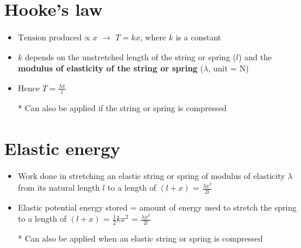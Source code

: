 \section{Hooke's law}
\begin{itemize}
    \item $\text{Tension produced}\propto x$ $\rightarrow$ $T=kx$, where $k$ is a constant
    \item $k$ depends on the unstretched length of the string or spring ($l$) and the \textbf{modulus of elasticity of the string or spring} ($\lambda$, unit = N)
    \item Hence $T=\frac{\lambda x}{l}$
    \item[*] Can also be applied if the string or spring is compressed
\end{itemize}

\section{Elastic energy}
\begin{itemize}
    \item Work done in stretching an elastic string or spring of modulus of elasticity $\lambda$ from its natural length $l$ to a length of $(l+x)$ = $\frac{\lambda x^2}{2l}$
    \item Elastic potential energy stored = amount of energy used to stretch the spring to a length of $(l+x)$ = $\frac{1}{2}kx^2$ = $\frac{\lambda x^2}{2l}$
    \item[*] Can also be applied when an elastic string or spring is compressed
\end{itemize}